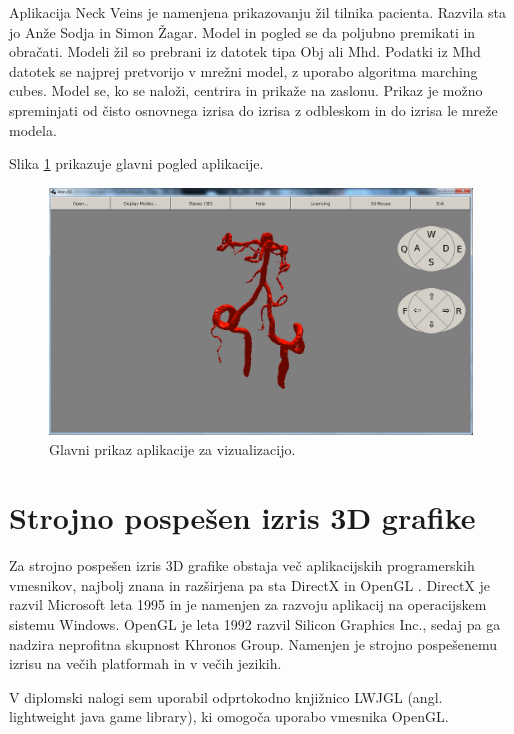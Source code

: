 \documentclass[a4paper, 12pt]{book}
\begin{document}
Aplikacija Neck Veins je namenjena prikazovanju žil tilnika pacienta. Razvila sta jo Anže Sodja\cite{sodja} in Simon Žagar\cite{zagar}. Model in pogled se da poljubno premikati in obračati. Modeli žil so prebrani iz datotek tipa Obj ali Mhd. Podatki iz Mhd datotek se najprej pretvorijo v mrežni model, z uporabo algoritma marching cubes.  Model se, ko se naloži, centrira in prikaže na zaslonu. Prikaz je možno spreminjati od čisto osnovnega izrisa do izrisa z odbleskom in do izrisa le mreže modela.

Slika \ref{aplikacija} prikazuje glavni pogled aplikacije. 

\begin{figure}[h!]
\begin{center}
\includegraphics[width=14cm]{Aplikacija.png}
\end{center}
\caption{Glavni prikaz aplikacije za vizualizacijo.}
\label{aplikacija}
\end{figure}

\section{Strojno pospešen izris 3D grafike}
Za strojno pospešen izris 3D grafike obstaja več aplikacijskih programerskih vmesnikov, najbolj znana in razširjena pa sta DirectX \cite{DirectX} in OpenGL \cite{OpenGL}. DirectX je razvil Microsoft leta 1995 in je namenjen za razvoju aplikacij na operacijskem sistemu Windows. OpenGL je leta 1992 razvil Silicon Graphics Inc., sedaj pa ga nadzira neprofitna skupnost Khronos Group. Namenjen je strojno pospešenemu izrisu na večih platformah in v večih jezikih. 

V diplomski nalogi sem uporabil odprtokodno knjižnico LWJGL (angl. lightweight java game library), ki omogoča uporabo vmesnika OpenGL.
\end{document}
